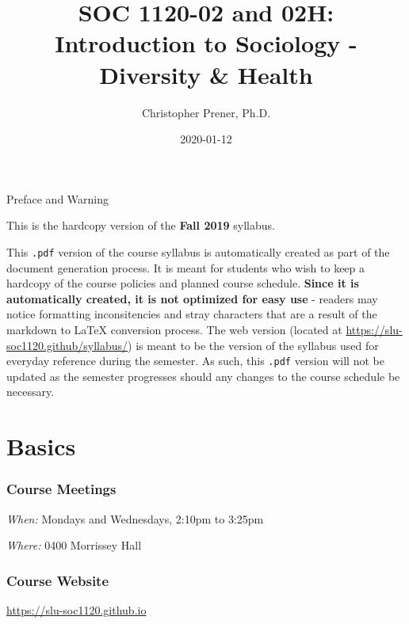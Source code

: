 \documentclass[]{book}
\title{SOC 1120-02 and 02H: Introduction to Sociology - Diversity \& Health}
\author{Christopher Prener, Ph.D.}
\date{2020-01-12}
\begin{document}
\maketitle

\begin{center}
{\huge Preface and Warning} \\
\end{center}
\vspace{5mm}
This is the hardcopy version of the \textbf{Fall 2019} syllabus.
\vspace{5mm}
\par \noindent This \texttt{.pdf} version of the course syllabus is automatically created as part of the document generation process. It is meant for students who wish to keep a hardcopy of the course policies and planned course schedule. \textbf{Since it is automatically created, it is not optimized for easy use} - readers may notice formatting inconsitencies and stray characters that are a result of the markdown to \LaTeX{} conversion process. The web version (located at \href{https://slu-soc1120.github/syllabus/}{https://slu-soc1120.github/syllabus/}) is meant to be the version of the syllabus used for everyday reference during the semester. As such, this \texttt{.pdf} version will not be updated as the semester progresses should any changes to the course schedule be necessary.

\hypertarget{basics}{%
\chapter*{Basics}\label{basics}}

\hypertarget{course-meetings}{%
\subsection*{Course Meetings}\label{course-meetings}}

\emph{When:} Mondays and Wednesdays, 2:10pm to 3:25pm

\emph{Where:} 0400 Morrissey Hall

\hypertarget{course-website}{%
\subsection*{Course Website}\label{course-website}}

\url{https://slu-soc1120.github.io}
\end{document}
